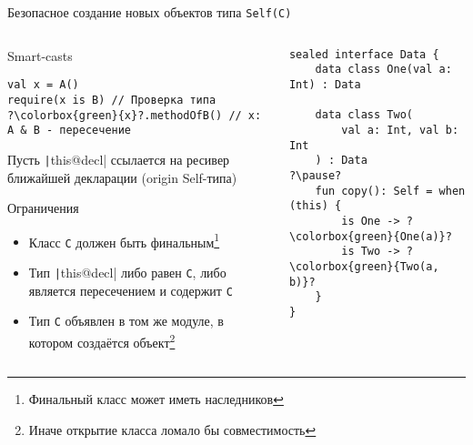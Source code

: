 \documentclass[handout,aspectratio=169,usenames,dvipsnames]{beamer}
\begin{document}
\begin{frame}[fragile]{Безопасное создание новых объектов типа \texttt{Self(C)}}
    \begin{columns}[onlytextwidth]
        \begin{column}{0.51\textwidth}
            \vspace{-0.5em}
            \begin{block}{Smart-casts}
                \begin{verbatim}
val x = A()
require(x is B) // Проверка типа
?\colorbox{green}{x}?.methodOfB() // x: A & B - пересечение
                \end{verbatim}
            \end{block}
            \pause
            \begin{block}{}
                Пусть \texttt|this@decl| ссылается на ресивер ближайшей декларации (origin Self-типа)
            \end{block}
            \pause
            \begin{block}{Ограничения}
                \begin{itemize}
                    \item Класс \texttt{C} должен быть финальным\footnote{Финальный класс может иметь наследников}
                    \item Тип \texttt|this@decl| либо равен \texttt{С}, либо является пересечением и содержит \texttt{C}
                    \item Тип \texttt{C} объявлен в том же модуле, в котором создаётся объект\footnote{Иначе открытие класса ломало бы совместимость}
                \end{itemize}
            \end{block}
        \end{column}\hfill%
        \begin{column}{0.46\textwidth}
            \pause
            \begin{verbatim}
sealed interface Data {
    data class One(val a: Int) : Data

    data class Two(
        val a: Int, val b: Int
    ) : Data
?\pause?
    fun copy(): Self = when (this) {
        is One -> ?\colorbox{green}{One(a)}?
        is Two -> ?\colorbox{green}{Two(a, b)}?
    }
}
            \end{verbatim}
        \end{column}
    \end{columns}
\end{frame}
\end{document}
